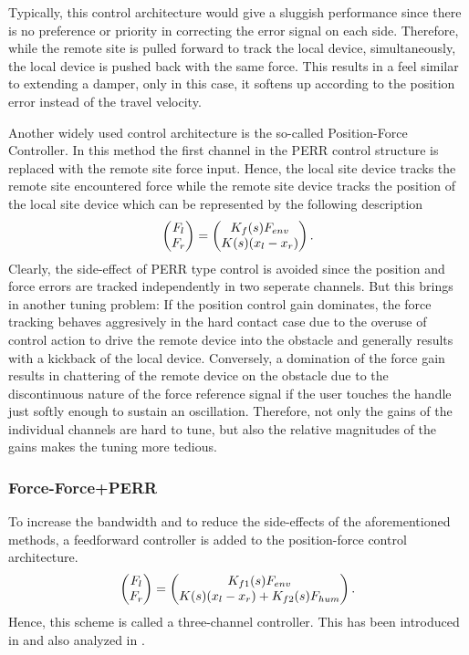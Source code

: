 Typically, this control architecture would give a sluggish performance since there is no preference or priority in 
correcting the error signal on each side. Therefore, while the remote site is pulled forward to track the local device,
simultaneously, the local device is pushed back with the same force. This results in a feel similar to extending a 
damper, only in this case, it softens up according to the position error instead of the travel velocity.

Another widely used control architecture is the so-called Position-Force Controller. In this method the first channel 
in the PERR control structure is replaced with the remote site force input. Hence, the local site device tracks the remote site 
encountered force while the remote site device tracks the position of the local site device which can be represented by the 
following description 
\[
\begin{pmatrix}F_l\\F_r\end{pmatrix} = \begin{pmatrix}K_f(s)F_{env} \\ K(s) (x_l-x_r)\end{pmatrix}.
\]
Clearly, the side-effect of PERR type control is avoided since the position and force errors are tracked independently 
in two seperate channels. But this brings in another tuning problem: If the position control gain dominates, the force tracking 
behaves aggresively in the hard contact case due to the overuse of control action to drive the remote device into the obstacle
and generally results with a kickback of the local device. Conversely, a domination of the force gain results in chattering of 
the remote device on the obstacle due to the discontinuous nature of the force reference signal if the user touches the handle 
just softly enough to sustain an oscillation. Therefore, not only the gains of the individual channels are hard to tune, but
also the relative magnitudes of the gains makes the tuning more tedious.

\subsubsection{Force-Force+PERR}

To increase the bandwidth and to reduce the side-effects of the aforementioned methods, a feedforward controller is added to the 
position-force control architecture. 
\[
\begin{pmatrix}F_l\\F_r\end{pmatrix} = \begin{pmatrix}K_{f1}(s)F_{env} \\ K(s) (x_l-x_r)+K_{f2}(s)F_{hum}\end{pmatrix}.
\]
Hence, this scheme is called a three-channel controller. This has been introduced in \cite{hashzaad1999} and also analyzed in \cite{naerumhannaford}.


